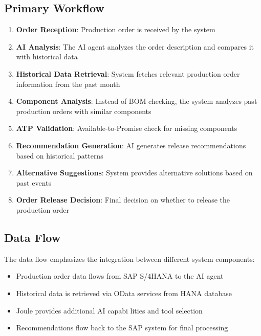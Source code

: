 \subsection{Primary Workflow}

\begin{enumerate}
    \item \textbf{Order Reception}: Production order is received by the system
    \item \textbf{AI Analysis}: The AI agent analyzes the order description and compares it with historical data
    \item \textbf{Historical Data Retrieval}: System fetches relevant production order information from the past month
    \item \textbf{Component Analysis}: Instead of BOM checking, the system analyzes past production orders with similar components
    \item \textbf{ATP Validation}: Available-to-Promise check for missing components
    \item \textbf{Recommendation Generation}: AI generates release recommendations based on historical patterns
    \item \textbf{Alternative Suggestions}: System provides alternative solutions based on past events
    \item \textbf{Order Release Decision}: Final decision on whether to release the production order
\end{enumerate}

\subsection{Data Flow}

The data flow emphasizes the integration between different system components:

\begin{itemize}
    \item Production order data flows from SAP S/4HANA to the AI agent
    \item Historical data is retrieved via OData services from HANA database
    \item Joule provides additional AI capabi   lities and tool selection
    \item Recommendations flow back to the SAP system for final processing
\end{itemize}
